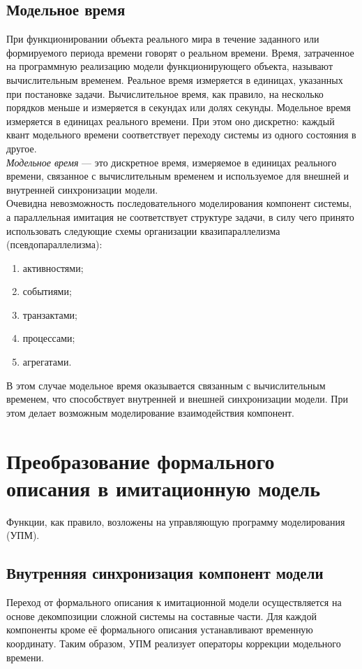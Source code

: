 \documentclass[12pt]{article}
\begin{document}
\subsection{Модельное время}
При функционировании объекта реального мира в течение заданного или формируемого периода времени говорят о реальном времени. Время, затраченное на программную реализацию модели функционирующего объекта, называют вычислительным временем. Реальное время измеряется в единицах, указанных при постановке задачи. Вычислительное время, как правило, на несколько порядков меньше и измеряется в секундах или долях секунды. Модельное время измеряется в единицах реального времени. При этом оно дискретно: каждый квант модельного времени соответствует переходу системы из одного состояния в другое.\\

\emph{Модельное время} --- это дискретное время, измеряемое в единицах реального времени, связанное с вычислительным временем и используемое для внешней и внутренней синхронизации модели.\\

Очевидна невозможность последовательного моделирования компонент системы, а параллельная имитация не соответствует структуре задачи, в силу чего принято использовать следующие схемы организации квазипараллелизма (псевдопараллелизма):

\begin{enumerate}
	\item активностями;
	\item событиями;
	\item транзактами;
	\item процессами;
	\item агрегатами.
\end{enumerate}

В этом случае модельное время оказывается связанным с вычислительным временем, что способствует внутренней и внешней синхронизации модели. При этом делает возможным моделирование взаимодействия компонент.

\newpage
\section{Преобразование формального описания в имитационную модель}
Функции, как правило, возложены на управляющую программу моделирования (УПМ).

\subsection{Внутренняя синхронизация компонент модели}
Переход от формального описания к имитационной модели осуществляется на основе декомпозиции сложной системы на составные части. Для каждой компоненты кроме её формального описания устанавливают временную координату. Таким образом, УПМ реализует операторы коррекции модельного времени.
\end{document}
